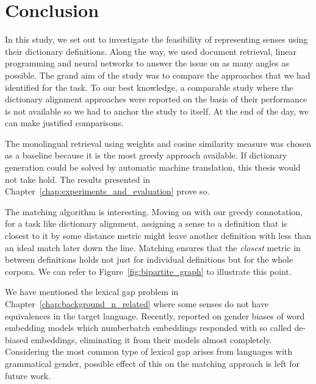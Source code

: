 
\chapter{Conclusion}%
\label{chap:conclusion}

In this study, we set out to investigate the feasibility of representing senses using their dictionary definitions.
Along the way, we used document retrieval, linear programming and neural networks to answer the issue on as many angles as possible.
The grand aim of the study was to compare the approaches that we had identified for the task.
To our best knowledge, a comparable study where the dictionary alignment approaches were reported on the basis of their performance is not available so we had to anchor the study to itself.
At the end of the day, we can make justified comparisons.

The monolingual retrieval using \tfidf weights and cosine similarity measure was chosen as a baseline because it is the most greedy approach available.
If dictionary generation could be solved by automatic machine translation, this thesis would not take hold.
The results presented in Chapter~\ref{chap:experiments_and_evaluation} prove so.

The matching algorithm is interesting.
Moving on with our greedy connotation, for a task like dictionary alignment, assigning a sense to a definition that is closest to it by some distance metric might leave another definition with less than an ideal match later down the line.
Matching ensures that the \emph{closest} metric in between definitions holds not just for individual definitions but for the whole corpora.
We can refer to Figure~\ref{fig:bipartite_graph} to illustrate this point.

We have mentioned the lexical gap problem in Chapter~\ref{chap:background_n_related} where some senses do not have equivalences in the target language.
Recently, \textcite{bolukbasi_man_2016} reported on gender biases of word embedding models which numberbatch embeddings responded with so called de-biased embeddings, eliminating it from their models almost completely.
Considering the most common type of lexical gap arises from languages with grammatical gender, possible effect of this on the matching approach is left for future work.

